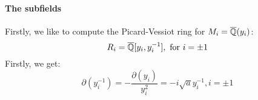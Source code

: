 \paragraph{The subfields}
Firstly, we like to compute the Picard-Vessiot ring for $M_{i} = \overline{\mathbb{Q}}(y_i)$:
$$R_i = \overline{\mathbb{Q}}[y_{i}, y_i^{-1}],\ \mathrm{for}\ i = \pm1$$
Firstly, we get:
$$\partial(y_i^{-1}) = -\frac{\partial(y_i)}{y_i^2} = -i \sqrt{a} y_i^{-1}, i =\pm1$$
